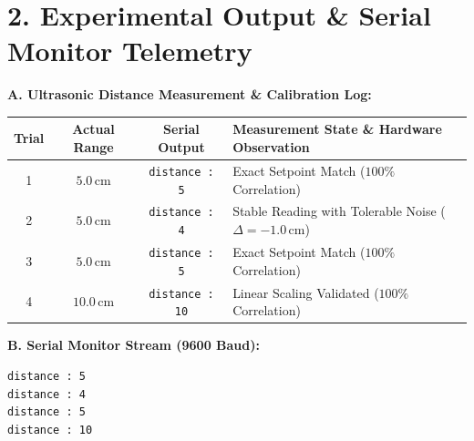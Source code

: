 \documentclass[11pt,a4paper]{article}
\begin{document}
\vspace{0.06cm}

\section*{2. Experimental Output \& Serial Monitor Telemetry}

\noindent
\textbf{A. Ultrasonic Distance Measurement \& Calibration Log:}\par\vspace{0.06cm}
{\footnotesize
\setlength{\tabcolsep}{6pt}
\renewcommand{\arraystretch}{1.18}
\begin{tabularx}{\textwidth}{|c|c|c|X|}
\hline
\textbf{Trial} & \textbf{Actual Range} & \textbf{Serial Output} & \textbf{Measurement State \& Hardware Observation} \\
\hline
1 & $5.0\,\text{cm}$ & \texttt{distance : 5} & Exact Setpoint Match ($100\%$ Correlation) \\
2 & $5.0\,\text{cm}$ & \texttt{distance : 4} & Stable Reading with Tolerable Noise ($\Delta = -1.0\,\text{cm}$) \\
3 & $5.0\,\text{cm}$ & \texttt{distance : 5} & Exact Setpoint Match ($100\%$ Correlation) \\
4 & $10.0\,\text{cm}$ & \texttt{distance : 10} & Linear Scaling Validated ($100\%$ Correlation) \\
\hline
\end{tabularx}
}

\vspace{0.22cm}

\noindent
\textbf{B. Serial Monitor Stream (9600 Baud):}\par\vspace{0.05cm}
\begin{lstlisting}[style=bwTerminal]
distance : 5
distance : 4
distance : 5
distance : 10
\end{lstlisting}
\end{document}
